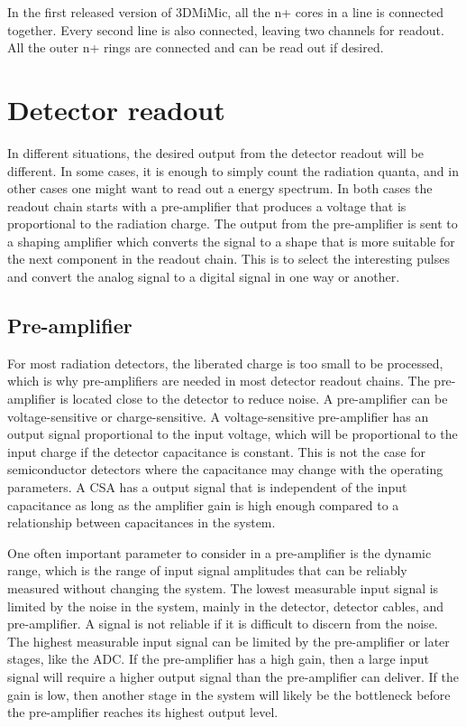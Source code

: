 \documentclass[../main/thesis.tex]{subfiles}
\begin{document}
In the first released version of 3DMiMic, all the n+ cores in a line is connected together. Every second line is also connected, leaving two channels for readout. All the outer n+ rings are connected and can be read out if desired. 



\section{Detector readout}
\label{t-read}
In different situations, the desired output from the detector readout will be different. In some cases, it is enough to simply count the radiation quanta, and in other cases one might want to read out a energy spectrum. In both cases the readout chain starts with a pre-amplifier that produces a voltage that is proportional to the radiation charge. The output from the pre-amplifier is sent to a shaping amplifier which converts the signal to a shape that is more suitable for the next component in the readout chain. This is to select the interesting pulses and convert the analog signal to a digital signal in one way or another. \citep[chap. 16]{Knoll}

\subsection{Pre-amplifier}
\label{t-amp}
For most radiation detectors, the liberated charge is too small to be processed, which is why pre-amplifiers are needed in most detector readout chains. The pre-amplifier is located close to the detector to reduce noise. A pre-amplifier can be voltage-sensitive or charge-sensitive. A voltage-sensitive pre-amplifier has an output signal proportional to the input voltage, which will be proportional to the input charge if the detector capacitance is constant. This is not the case for semiconductor detectors where the capacitance may change with the operating parameters. A \gls{CSA} has a output signal that is independent of the input capacitance as long as the amplifier gain is high enough compared to a relationship between capacitances in the system. \citep[chap. 16]{Knoll}

One often important parameter to consider in a pre-amplifier is the dynamic range, which is the range of input signal amplitudes that can be reliably measured without changing the system. The lowest measurable input signal is limited by the noise in the system, mainly in the detector, detector cables, and pre-amplifier. A signal is not reliable if it is difficult to discern from the noise. The highest measurable input signal can be limited by the pre-amplifier or later stages, like the \gls{ADC}. If the pre-amplifier has a high gain, then a large input signal will require a higher output signal than the pre-amplifier can deliver. If the gain is low, then another stage in the system will likely be the bottleneck before the pre-amplifier reaches its highest output level. \citep{dynamic-range}
\end{document}
